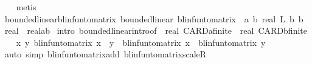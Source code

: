 \begin{isabellebody}
\ \ \isamarkupfalse%
\ metis{\isacharplus}{\kern0pt}%
\endisatagproof
{\isafoldproof}%
%
\isadelimproof
\isanewline
%
\endisadelimproof
\isanewline
{}\isamarkupfalse%
\ bounded{\isacharunderscore}{\kern0pt}linear{\isacharunderscore}{\kern0pt}blinfun{\isacharunderscore}{\kern0pt}to{\isacharunderscore}{\kern0pt}matrix{\isacharcolon}{\kern0pt}\ {\isachardoublequoteopen}bounded{\isacharunderscore}{\kern0pt}linear\ {\isacharparenleft}{\kern0pt}blinfun{\isacharunderscore}{\kern0pt}to{\isacharunderscore}{\kern0pt}matrix\ {\isacharcolon}{\kern0pt}{\isacharcolon}{\kern0pt}\ {\isacharparenleft}{\kern0pt}{\isacharprime}{\kern0pt}a\ {\isasymRightarrow}\isactrlsub b\ real{\isacharparenright}{\kern0pt}\ {\isasymRightarrow}\isactrlsub L\ {\isacharparenleft}{\kern0pt}{\isacharprime}{\kern0pt}b\ {\isasymRightarrow}\isactrlsub b\ real{\isacharparenright}{\kern0pt}\ {\isasymRightarrow}\ real{\isacharcircum}{\kern0pt}{\isacharprime}{\kern0pt}a{\isacharcircum}{\kern0pt}{\isacharprime}{\kern0pt}b{\isacharparenright}{\kern0pt}{\isachardoublequoteclose}\isanewline
%
\isadelimproof
%
\endisadelimproof
%
\isatagproof
{}\isamarkupfalse%
\ {\isacharparenleft}{\kern0pt}intro\ bounded{\isacharunderscore}{\kern0pt}linear{\isacharunderscore}{\kern0pt}intro{\isacharbrackleft}{\kern0pt}of\ {\isacharunderscore}{\kern0pt}\ {\isachardoublequoteopen}real\ CARD{\isacharparenleft}{\kern0pt}{\isacharprime}{\kern0pt}a{\isacharcolon}{\kern0pt}{\isacharcolon}{\kern0pt}finite{\isacharparenright}{\kern0pt}\ {\isacharasterisk}{\kern0pt}\ real\ CARD{\isacharparenleft}{\kern0pt}{\isacharprime}{\kern0pt}b{\isacharcolon}{\kern0pt}{\isacharcolon}{\kern0pt}finite{\isacharparenright}{\kern0pt}{\isachardoublequoteclose}{\isacharbrackright}{\kern0pt}{\isacharparenright}{\kern0pt}\isanewline
\ \ \isamarkupfalse%
\ {\isachardoublequoteopen}{\isasymAnd}x\ y{\isachardot}{\kern0pt}\ blinfun{\isacharunderscore}{\kern0pt}to{\isacharunderscore}{\kern0pt}matrix\ {\isacharparenleft}{\kern0pt}x\ {\isacharplus}{\kern0pt}\ y{\isacharparenright}{\kern0pt}\ {\isacharequal}{\kern0pt}\ blinfun{\isacharunderscore}{\kern0pt}to{\isacharunderscore}{\kern0pt}matrix\ x\ {\isacharplus}{\kern0pt}\ blinfun{\isacharunderscore}{\kern0pt}to{\isacharunderscore}{\kern0pt}matrix\ y{\isachardoublequoteclose}\isanewline
\ \ \ \ \isamarkupfalse%
\ {\isacharparenleft}{\kern0pt}auto\ simp{\isacharcolon}{\kern0pt}\ blinfun{\isacharunderscore}{\kern0pt}to{\isacharunderscore}{\kern0pt}matrix{\isacharunderscore}{\kern0pt}add\ blinfun{\isacharunderscore}{\kern0pt}to{\isacharunderscore}{\kern0pt}matrix{\isacharunderscore}{\kern0pt}scaleR{\isacharparenright}{\kern0pt}\isanewline

\end{isabellebody}
